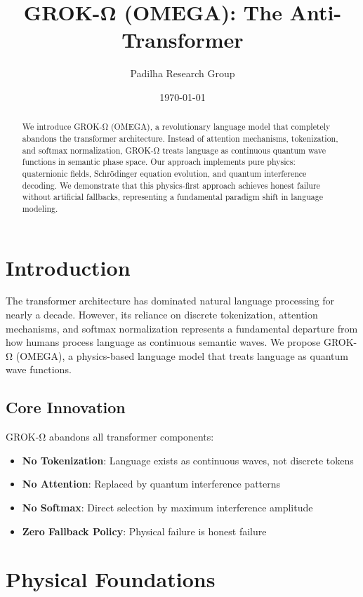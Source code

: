 \documentclass[11pt,a4paper]{article}
\title{GROK-Ω (OMEGA): The Anti-Transformer}
\author{Padilha Research Group}
\date{\today}
\begin{document}
\maketitle

\begin{abstract}
We introduce GROK-Ω (OMEGA), a revolutionary language model that completely abandons the transformer architecture. Instead of attention mechanisms, tokenization, and softmax normalization, GROK-Ω treats language as continuous quantum wave functions in semantic phase space. Our approach implements pure physics: quaternionic fields, Schrödinger equation evolution, and quantum interference decoding. We demonstrate that this physics-first approach achieves honest failure without artificial fallbacks, representing a fundamental paradigm shift in language modeling.
\end{abstract}

\section{Introduction}

The transformer architecture \cite{vaswani2017attention} has dominated natural language processing for nearly a decade. However, its reliance on discrete tokenization, attention mechanisms, and softmax normalization represents a fundamental departure from how humans process language as continuous semantic waves. We propose GROK-Ω (OMEGA), a physics-based language model that treats language as quantum wave functions.

\subsection{Core Innovation}

GROK-Ω abandons all transformer components:
\begin{itemize}
\item \textbf{No Tokenization}: Language exists as continuous waves, not discrete tokens
\item \textbf{No Attention}: Replaced by quantum interference patterns
\item \textbf{No Softmax}: Direct selection by maximum interference amplitude
\item \textbf{Zero Fallback Policy}: Physical failure is honest failure
\end{itemize}

\section{Physical Foundations}
\end{document}

